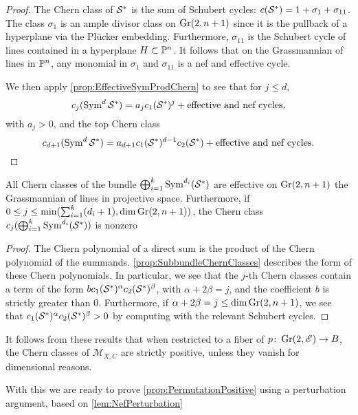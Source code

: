 \begin{proof}
	The Chern class of $\sS^*$ is the sum of Schubert cycles: $c(\sS^*) = 1 + \sigma_1 + \sigma_{11}$. The class $\sigma_1$ is an ample divisor class on $\Gr(2,n+1)$ since it is the pullback of a hyperplane via the Plücker embedding. Furthermore, $\sigma_{11}$ is the Schubert cycle of lines contained in a hyperplane $H \subset \P^n$. It follows that on the Grassmannian of lines in $\P^n$, any monomial in $\sigma_1$ and $\sigma_{11}$ is a nef and effective cycle.

 We then apply \cref{prop:EffectiveSymProdChern} to see that for $j \leq d$, 
	\[c_j(\Sym^d \sS^*) = a_j c_1(\sS^*)^j + \text{effective and nef cycles},\] with $a_j >0$, and the top Chern class 
	\[c_{d+1}(\Sym^d \sS^*) = a_{d+1}c_1(\sS^*)^{d-1}c_2(\sS^*) + \text{effective and nef cycles}.\]
\end{proof}

\begin{corollary}
	\label{cor:SumSubbundleChern}
	All Chern classes of the bundle $\bigoplus_{i=1}^k \Sym^{d_i}(\sS^*)$ are effective on $\Gr(2,n+1)$ the Grassmannian of lines in projective space. Furthermore, if $0 \leq j \leq \min(\sum_{i=1}^k (d_i +1), \dim \Gr(2,n+1))$, the Chern class $c_j(\bigoplus_{i=1}^k \Sym^{d_i}(\sS^*))$ is nonzero
\end{corollary}
\begin{proof}
	The Chern polynomial of a direct sum is the product of the Chern polynomial of the summands. \cref{prop:SubbundleChernClasses} describes the form of these Chern polynomials. In particular, we see that the $j$-th Chern classes contain a term of the form $bc_1(\sS^*)^\alpha c_2(\sS^*)^\beta$, with $\alpha + 2\beta = j$, and the coefficient $b$ is strictly greater than $0$. Furthermore, if $\alpha + 2\beta = j \leq \dim \Gr(2,n+1)$, we see that $c_1(\sS^*)^\alpha c_2(\sS^*)^\beta > 0$ by computing with the relevant Schubert cycles. 
\end{proof}

It follows from these results that when restricted to a fiber of $p \from \Gr(2,\sE) \to B$, the Chern classes of $\mathscr{M}_{X,C}$ are strictly positive, unless they vanish for dimensional reasons.

With this we are ready to prove \cref{prop:PermutationPositive} using a perturbation argument, based on \cref{lem:NefPerturbation}

